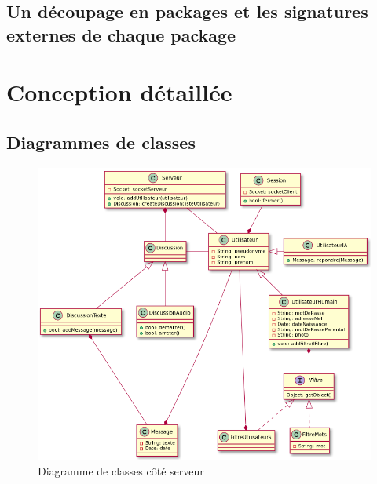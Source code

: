 \documentclass[a4paper,12pt]{article}
\begin{document}
	\subsection{Un découpage en packages et les signatures externes de chaque package}


	\section{Conception détaillée}

	\subsection{Diagrammes de classes}

	\begin{figure}[H]
		\centerline{\includegraphics[width=16.5cm]{../diagrammes/img/classesServeur.png}}
		\caption{Diagramme de classes côté serveur}
	\end{figure}
\end{document}
